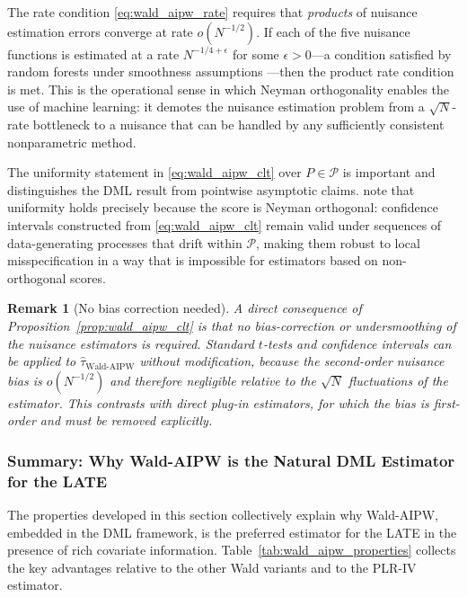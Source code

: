 \documentclass[12pt,a4paper]{article}
\newtheorem{remark}{Remark}
\begin{document}
\noindent
The rate condition \eqref{eq:wald_aipw_rate} requires that \emph{products} of nuisance
estimation errors converge at rate $o(N^{-1/2})$. If each of the five nuisance functions
is estimated at a rate $N^{-1/4+\epsilon}$ for some $\epsilon > 0$---a condition satisfied
by random forests under smoothness assumptions \citep[p.~C26]{chernozhukov2018double}---then
the product rate condition is met. This is the operational sense in which Neyman orthogonality
enables the use of machine learning: it demotes the nuisance estimation problem from a
$\sqrt{N}$-rate bottleneck to a nuisance that can be handled by any sufficiently consistent
nonparametric method.
 
The uniformity statement in \eqref{eq:wald_aipw_clt} over $P \in \mathcal{P}$ is
important and distinguishes the DML result from pointwise asymptotic claims.
\citet[p.~C27]{chernozhukov2018double} note that uniformity holds precisely because the
score is Neyman orthogonal: confidence intervals constructed from \eqref{eq:wald_aipw_clt}
remain valid under sequences of data-generating processes that drift within $\mathcal{P}$,
making them robust to local misspecification in a way that is impossible for estimators
based on non-orthogonal scores.
 
\begin{remark}[No bias correction needed]
\label{rem:no_bias_correction}
A direct consequence of Proposition~\ref{prop:wald_aipw_clt} is that no bias-correction
or undersmoothing of the nuisance estimators is required. Standard $t$-tests and
confidence intervals can be applied to $\hat\tau_{\mathrm{Wald\text{-}AIPW}}$ without
modification, because the second-order nuisance bias is $o(N^{-1/2})$ and therefore
negligible relative to the $\sqrt{N}$ fluctuations of the estimator. This contrasts with
direct plug-in estimators, for which the bias is first-order and must be removed
explicitly.
\end{remark}
 
\subsubsection{Summary: Why Wald-AIPW is the Natural DML Estimator for the LATE}
\label{subsubsec:wald_aipw_summary}
 
The properties developed in this section collectively explain why Wald-AIPW, embedded in
the DML framework, is the preferred estimator for the LATE in the presence of rich
covariate information. Table~\ref{tab:wald_aipw_properties} collects the key advantages
relative to the other Wald variants and to the PLR-IV estimator.
 
\end{document}
